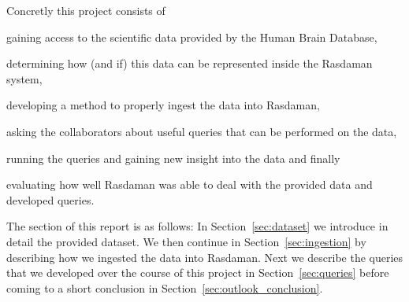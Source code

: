 Concretly this project consists of
\begin{inparaenum}[(1)]
\item gaining access to the scientific data provided by the Human Brain Database,
\item determining how (and if) this data can be represented inside the Rasdaman system,
\item developing a method to properly ingest the data into Rasdaman,
\item asking the collaborators about useful queries that can be performed on the data,
\item running the queries and gaining new insight into the data and finally
\item evaluating how well Rasdaman was able to deal with the provided data and developed queries.
\end{inparaenum}

The section of this report is as follows: In Section~\ref{sec:dataset} we introduce in detail the provided dataset. We then continue in Section~\ref{sec:ingestion} by describing how we ingested the data into Rasdaman. Next we describe the queries that we developed over the course of this project in Section~\ref{sec:queries} before coming to a short conclusion in Section~\ref{sec:outlook_conclusion}. 
